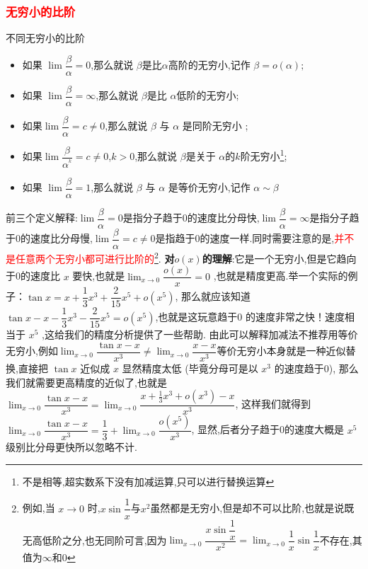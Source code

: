 \documentclass[8pt a4paper, oneside, UTF8]{ctexbook}
\begin{document}
\begin{sloppypar}
    \subsubsection{\textcolor{red}{无穷小的比阶}}
    \begin{defn}{不同无穷小的比阶}{}
        \begin{itemize}
            \item 如果 $\lim \dfrac{\beta}{\alpha} =0$,那么就说 $\beta$是比$\alpha$高阶的无穷小,记作 $\beta=o(\alpha);$
            \item  如果 $\lim \dfrac\beta\alpha  =\infty$,那么就说 $\beta$是比 $\alpha$低阶的无穷小;
            \item 如果$\lim\dfrac{\beta}{\alpha} =c\neq 0$,那么就说 $\beta$ 与 $\alpha$ 是同阶无穷小 ;
            \item 如果$\lim\dfrac{\beta}{\alpha^{^k}} =c \neq 0$,$k > 0$,那么就说 $\beta$是关于 $\alpha$的$k$阶无穷小\footnote{不是相等,超实数系下没有加减运算,只可以进行替换运算};
            \item 如果 $\lim \dfrac\beta\alpha = 1$,那么就说 $\beta$ 与 $\alpha$ 是等价无穷小,记作 $\alpha\sim\beta$
        \end{itemize}
    \end{defn}
    前三个定义解释:$\lim \dfrac{\beta}{\alpha} =0$是指分子趋于$0$的速度比分母快,$\lim \dfrac\beta\alpha =\infty$是指分子趋于$0$的速度比分母慢,$\lim\dfrac{\beta}{\alpha} =c\neq 0$是指趋于$0$的速度一样.同时需要注意的是,\textcolor{red}{并不是任意两个无穷小都可进行比阶的}\footnote{例如,当 $x\to 0$ 时,$x\sin\dfrac1x$与$x^2$虽然都是无穷小,但是却不可以比阶,也就是说既无高低阶之分,也无同阶可言,因为$\lim_{x \to 0}\dfrac{x \sin \dfrac{1}{x}}{x^2}=\lim_{x\to0}\dfrac1x\sin\dfrac1x$不存在,其值为$\infty$和$0$}.
    \newline
    \textbf{对$o(x)$的理解}:它是一个无穷小,但是它趋向于0的速度比 $x$ 要快,也就是$\lim_{x\to0}\dfrac{o(x)}{x}=0$ ,也就是精度更高.举一个实际的例子：$\tan x=x+\dfrac13x^3+\dfrac2{15}x^5+o\left(x^5\right)$, 那么就应该知道$\tan x-x-\dfrac{1}{3}x^{3}-\dfrac{2}{15}x^{5}=o\left(x^{5}\right)$,也就是这玩意趋于0 的速度非常之快！速度相当于 $x^5$ ,这给我们的精度分析提供了一些帮助. 由此可以解释加减法不推荐用等价无穷小,例如$\lim_{x\to0}\dfrac{\tan x-x}{x^3}\neq\lim_{x\to0}\dfrac{x-x}{x^3}$等价无穷小本身就是一种近似替换,直接把 $\tan x$ 近似成 $x$ 显然精度太低 (毕竟分母可是以 $x^3$ 的速度趋于0), 那么我们就需要更高精度的近似了,也就是 $\lim_{x\to0}\dfrac{\tan x-x}{x^3}=\lim_{x\to0}\dfrac{x+\frac13x^3+o\left(x^3\right)-x}{x^3}$, 这样我们就得到 $\lim_{x\to0}\dfrac{\tan x-x}{x^3}=\dfrac13+\lim_{x\to0}\dfrac{o(x^5)}{x^3}$, 显然,后者分子趋于0的速度大概是 $x^5$ 级别比分母更快所以忽略不计.

\end{sloppypar}
\end{document}
